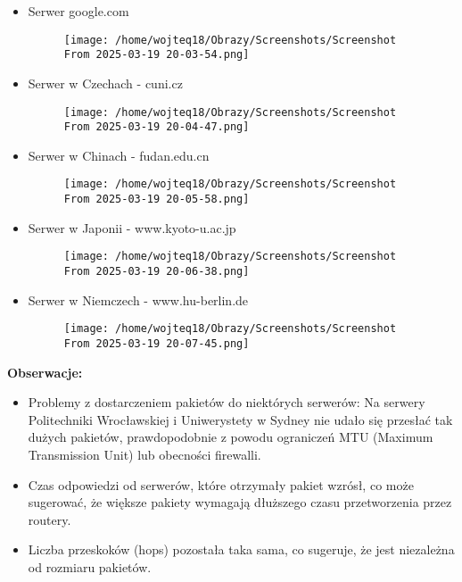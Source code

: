 \documentclass{article}
\begin{document}
\begin{itemize}
  \item Serwer google.com
    \begin{figure}[H]
      \centering
      \texttt{[image: /home/wojteq18/Obrazy/Screenshots/Screenshot From 2025-03-19 20-03-54.png]}
      \label{fig:large_google}
    \end{figure}

  \item Serwer w Czechach - cuni.cz
    \begin{figure}[H]
      \centering
      \texttt{[image: /home/wojteq18/Obrazy/Screenshots/Screenshot From 2025-03-19 20-04-47.png]}
      \label{fig:large_cuni}
    \end{figure}

  \item Serwer w Chinach - fudan.edu.cn
    \begin{figure}[H]
      \centering
      \texttt{[image: /home/wojteq18/Obrazy/Screenshots/Screenshot From 2025-03-19 20-05-58.png]}
      \label{fig:large_fudan}
    \end{figure}

  \item Serwer w Japonii - www.kyoto-u.ac.jp
    \begin{figure}[H]
      \centering
      \texttt{[image: /home/wojteq18/Obrazy/Screenshots/Screenshot From 2025-03-19 20-06-38.png]}
      \label{fig:large_kyoto}
    \end{figure}

  \item Serwer w Niemczech - www.hu-berlin.de
    \begin{figure}[H]
      \centering
      \texttt{[image: /home/wojteq18/Obrazy/Screenshots/Screenshot From 2025-03-19 20-07-45.png]}
      \label{fig:large_hu_berlin}
    \end{figure}
\end{itemize}

\vspace{1\baselineskip}
\textbf{Obserwacje:}

\vspace{1\baselineskip}
\begin{itemize}
  \item Problemy z dostarczeniem pakietów do niektórych serwerów: Na serwery Politechniki Wrocławskiej i Uniwerystety w Sydney nie udało
  się przesłać tak dużych pakietów, prawdopodobnie z powodu ograniczeń MTU (Maximum Transmission Unit) lub obecności firewalli.
  \item Czas odpowiedzi od serwerów, które otrzymały pakiet wzrósł, co może sugerować, że większe pakiety wymagają dłuższego czasu
  przetworzenia przez routery.
  \item Liczba przeskoków (hops) pozostała taka sama, co sugeruje, że jest niezależna od rozmiaru pakietów.
\end{itemize}
\end{document}
